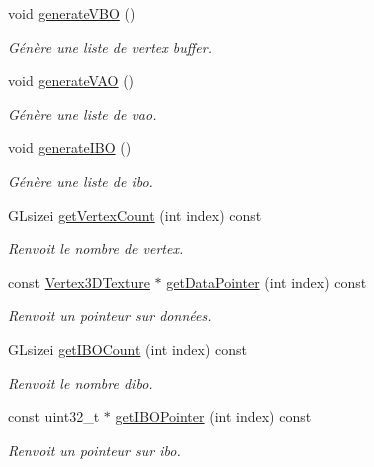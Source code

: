 \begin{DoxyCompactItemize}
void \hyperlink{classglimac_1_1CubeList_a7fc99dde6285a3b0ffc14b86f9844edc}{generate\+V\+BO} ()
\begin{DoxyCompactList}\small\item\em Génère une liste de vertex buffer. \end{DoxyCompactList}\item 
void \hyperlink{classglimac_1_1CubeList_a098351d44d9b56a3ca3f4643a0dec302}{generate\+V\+AO} ()
\begin{DoxyCompactList}\small\item\em Génère une liste de vao. \end{DoxyCompactList}\item 
void \hyperlink{classglimac_1_1CubeList_a179fb745e2097440a88f6818a14a457e}{generate\+I\+BO} ()
\begin{DoxyCompactList}\small\item\em Génère une liste de ibo. \end{DoxyCompactList}\item 
G\+Lsizei \hyperlink{classglimac_1_1CubeList_a5f1ea621736982934d8672771d42406f}{get\+Vertex\+Count} (int index) const
\begin{DoxyCompactList}\small\item\em Renvoit le nombre de vertex. \end{DoxyCompactList}\item 
const \hyperlink{structglimac_1_1Vertex3DTexture}{Vertex3\+D\+Texture} $\ast$ \hyperlink{classglimac_1_1CubeList_a990f5d349a4b6fd690f8b61d0ebacd7f}{get\+Data\+Pointer} (int index) const
\begin{DoxyCompactList}\small\item\em Renvoit un pointeur sur données. \end{DoxyCompactList}\item 
G\+Lsizei \hyperlink{classglimac_1_1CubeList_a317ef23831d1ec198f69586bcd5fa749}{get\+I\+B\+O\+Count} (int index) const
\begin{DoxyCompactList}\small\item\em Renvoit le nombre d\textquotesingle{}ibo. \end{DoxyCompactList}\item 
const uint32\+\_\+t $\ast$ \hyperlink{classglimac_1_1CubeList_af52e02f29a9b4a13418cf4e90eec2562}{get\+I\+B\+O\+Pointer} (int index) const
\begin{DoxyCompactList}\small\item\em Renvoit un pointeur sur ibo. \end{DoxyCompactList}\item 

\end{DoxyCompactItemize}
